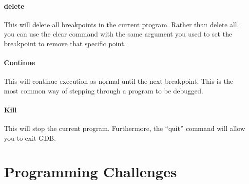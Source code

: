 		\paragraph{delete}
		This will delete all breakpoints in the current program. 
		Rather than delete all, 
		you can use the clear command with the same argument you used to set the breakpoint to remove that specific point. 

		\paragraph{Continue}
		This will continue execution as normal until the next breakpoint. 
		This is the most common way of stepping through a program to be debugged. 
			
		\paragraph{Kill}
		This will stop the current program. 
		Furthermore, the ``quit'' command will allow you to exit GDB. 

	\section{Programming Challenges}
